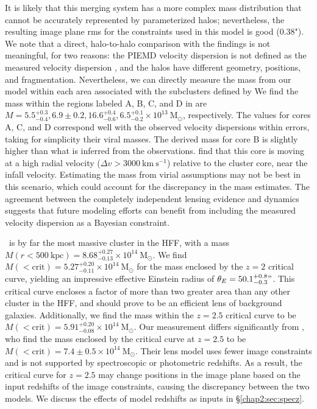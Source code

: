 \begin{figure}[h]
\label{chap2:fig:crit_m0717}
\end{figure}


It is likely that this merging system has a more complex mass distribution that cannot be accurately represented by parameterized halos; nevertheless, the resulting image plane rms for the constraints used in this model is good (0.38"). We note that a direct, halo-to-halo comparison with the \citet{Ma:2009gf} findings is not meaningful, for two reasons: the PIEMD velocity dispersion is not defined as the measured velocity dispersion \citep[see][]{Eliasdottir:2007ve}, and the halos have different geometry, positions, and fragmentation. Nevertheless, we can directly measure the mass from our model within each area associated with the subclusters defined by \citet{Ma:2009gf} We find the mass within the regions labeled A, B, C, and D in \citet{Ma:2009gf} are $M = 5.5^{+0.3}_{-0.4}, 6.9\pm0.2, 16.6^{+0.4}_{-0.6}, 6.5^{+0.1}_{-0.2}\times10^{13}\ \mathrm{M_\odot}$, respectively. The values for cores A, C, and D correspond well with the observed velocity dispersions within errors, taking for simplicity their viral masses. The derived mass for core B is slightly higher than what is inferred from the observations. \citet{Ma:2009gf} find that this core is moving at a high radial velocity ($\Delta v>3000 \ \mathrm{km\ s^{-1}}$) relative to the cluster core, near the infall velocity. Estimating the mass from virial assumptions may not be best in this scenario, which could account for the discrepancy in the mass estimates. The agreement between the completely independent lensing evidence and dynamics suggests that future modeling efforts can benefit from including the measured velocity dispersion as a Bayesian constraint. 

\MACSzeroseven\ is by far the most massive cluster in the HFF, with a mass $M(r<500\ \mathrm{kpc})=8.68^{+0.27}_{-0.13}\times10^{14}\ \mathrm{M_\odot}$. We find $M(<\mathrm{crit})=5.27^{+0.20}_{-0.11}\times10^{14}\ \mathrm{M_\odot}$ for the mass enclosed by the $z=2$ critical curve, yielding an impressive effective Einstein radius of $\theta_E=50.1^{+0.8}_{-0.3}"$. This critical curve encloses a factor of more than two greater area than any other cluster in the HFF, and should prove to be an efficient lens of background galaxies. Additionally, we find the mass within the $z=2.5$ critical curve to be $M(<\mathrm{crit})=5.91^{+0.20}_{-0.08}\times10^{14}\ \mathrm{M_\odot}$. Our measurement differs significantly from \citet{Zitrin:2009qy}, who find the mass enclosed by the critical curve at $z=2.5$ to be $M(<\mathrm{crit})=7.4\pm0.5\times10^{14}\ \mathrm{M_\odot}$. Their lens model uses fewer image constraints and is not supported by spectroscopic or photometric redshifts. As a result, the critical curve for $z=2.5$ may change positions in the image plane based on the input redshifts of the image constraints, causing the discrepancy between the two models. We discuss the effects of model redshifts as inputs in \S \ref{chap2:sec:specz}.

